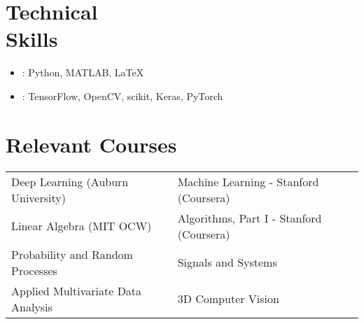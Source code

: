 \documentclass[mm]{simple_style}
\begin{document}
\begin{resume}
\vspace{-1ex}
\section{Technical\\Skills}
\begin{itemize}[label={}, leftmargin=0pt, topsep=0pt]
\item {}: Python, MATLAB, \LaTeX 
\item {}: TensorFlow, OpenCV, scikit, Keras, PyTorch 
\end{itemize}
\vspace{-2ex}
\sectionline

\vspace{-1ex}
\section{Relevant Courses}
\begingroup
\renewcommand{\arraystretch}{1.3} %
\begin{tabular}{@{\hskip -0.2pt}l @{\hskip 15ex}l }
Deep Learning (Auburn University) & Machine Learning - Stanford (Coursera) \\
Linear Algebra (MIT OCW) & Algorithms, Part I - Stanford (Coursera)\\
Probability and Random Processes & Signals and Systems\\
Applied Multivariate Data Analysis & 3D Computer Vision\\
\end{tabular}
\endgroup
\\[2.5ex]
\sectionline


\end{resume}
\end{document}
